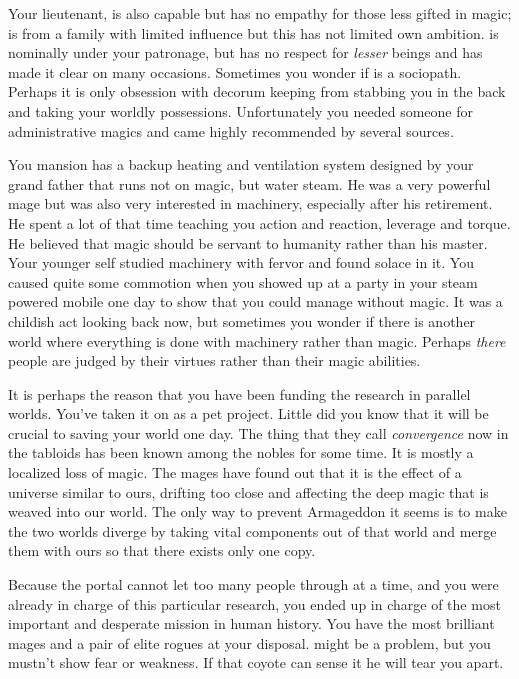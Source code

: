 \documentclass[char]{guildcamp3}
\begin{document}
Your lieutenant, \cNobleTwo{\intro} is also capable but has no empathy for those less gifted in magic;  is from a family with limited influence but this has not limited  own ambition. \cNobleTwo{} is nominally under your patronage, but  has no respect for \emph{lesser} beings and has made it clear on many occasions. Sometimes you wonder if \cNobleTwo{} is a sociopath. Perhaps it is only  obsession with decorum keeping \cNobleTwo{\them} from stabbing you in the back and taking your worldly possessions. Unfortunately you needed someone for administrative magics and \cNobleTwo{} came highly recommended by several sources. 

You mansion has a backup heating and ventilation system designed by your grand father that runs not on magic, but water steam. He was a very powerful mage but was also very interested in machinery, especially after his retirement. He spent a lot of that time teaching you action and reaction, leverage and torque. He believed that magic should be servant to humanity rather than his master. Your younger self studied machinery with fervor and found solace in it. You caused quite some commotion when you showed up at a party in your steam powered mobile one day to show that you could manage without magic. It was a childish act looking back now, but sometimes you wonder if there is another world where everything is done with machinery rather than magic. Perhaps \emph{there} people are judged by their virtues rather than their magic abilities.

It is perhaps the reason that you have been funding the research in parallel worlds. You've taken it on as a pet project. Little did you know that it will be crucial to saving your world one day. The thing that they call \emph{convergence} now in the tabloids has been known among the nobles for some time. It is mostly a localized loss of magic. The mages have found out that it is the effect of a universe similar to ours, drifting too close and affecting the deep magic that is weaved into our world. The only way to prevent Armageddon it seems is to make the two worlds diverge by taking vital components out of that world and merge them with ours so that there exists only one copy.  

Because the portal cannot let too many people through at a time, and you were already in charge of this particular research, you ended up in charge of the most important and desperate mission in human history. You have the most brilliant mages and a pair of elite rogues at your disposal. \cNobleTwo{} might be a problem, but you mustn't show fear or weakness. If that coyote can sense it he will tear you apart. 
\end{document}
